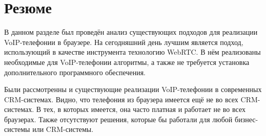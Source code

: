 \section{Резюме}

В данном разделе был проведён анализ существующих подходов для реализации VoIP-телефонии в браузере. На сегодняшний день лучшим является подход, использующий в качестве инструмента технологию WebRTC. В нём реализованы необходимые для VoIP-телефонии алгоритмы, а также не требуется установка дополнительного программного обеспечения.

Были рассмотренны и существующие реализации VoIP-телефонии в современных CRM-системах. Видно, что телефония из браузера имеется ещё не во всех CRM-системах. В тех, в которых имеется, она часто платная и работает не во всех браузерах. Также отсутствуют решения, которые бы работали для любой бизнес-системы или CRM-системы.
